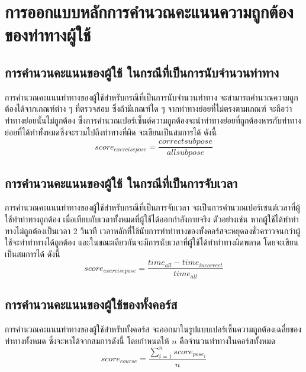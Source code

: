 \section{การออกแบบหลักการคำนวณคะแนนความถูกต้องของท่าทางผู้ใช้}
\subsection{การคำนวนคะแนนของผู้ใช้ ในกรณีที่เป็นการนับจำนวนท่าทาง}
การคำนวณคะแนนท่าทางของผู้ใช้สำหรับกรณีที่เป็นการนับจำนวนท่าทาง จะสามารถคำนวณความถูกต้องได้จากเกณฑ์ต่าง ๆ ที่ตรวจสอบ ซึ่งถ้ามีเกณฑ์ใด ๆ จากท่าทางย่อยที่ไม่ตรงตามเกณฑ์ จะถือว่าท่าทางย่อยนั้นไม่ถูกต้อง ซึ่งการคำนวณเปอร์เซ็นต์ความถูกต้องจะนำท่าทางย่อยที่ถูกต้องหารกับท่าทางย่อยที่ได้ทำทั้งหมดซึ่งจะรวมไปถึงท่าทางที่ผิด จะเขียนเป็นสมการได้ ดังนี้
\begin{equation}
    score_{exercise pose} = \frac{correct subpose}{all subpose}
\end{equation}

\subsection{การคำนวนคะแนนของผู้ใช้ ในกรณีที่เป็นการจับเวลา}
การคำนวณคะแนนท่าทางของผู้ใช้สำหรับกรณีที่เป็นการจับเวลา จะเป็นการคำนวณเปอร์เซนต์เวลาที่ผู้ใช้ทำท่าทางถูกต้อง เมื่อเทียบกับเวลาทั้งหมดที่ผู้ใช้ได้ออกกำลังกายจริง ตัวอย่างเช่น หากผู้ใช้ได้ทำท่าทางไม่ถูกต้องเป็นเวลา 2 วินาที เวลาหลักที่ใช้นับการทำท่าทางของทั้งคอร์สจะหยุดลงชั่วคราวจนกว่าผู้ใช้จะทำท่าทางได้ถูกต้อง และในขณะเดียวกันจะมีการนับเวลาที่ผู้ใช้ได้ทำท่าทางผิดพลาด โดยจะเขียนเป็นสมการได้ ดังนี้
\begin{equation}
     score_{exercise pose} = \frac{time_{all} - time_{incorrect}}{time_{all}}
\end{equation}


\subsection{การคำนวนคะแนนของผู้ใช้ของทั้งคอร์ส}
การคำนวณคะแนนท่าทางของผู้ใช้สำหรับทั้งคอร์ส จะออกมาในรูปแบบเปอร์เซ็นความถูกต้องเฉลี่ยของท่าทางทั้งหมด ซึ่งจะหาได้จากสมการดังนี้ โดยกำหนดให้ $n$ คือจำนวนท่าทางในคอร์สทั้งหมด
\begin{equation}
    score_{course} = \frac{\sum_{i=1}^{n}{score_{pose_i}}}{n}
\end{equation}

